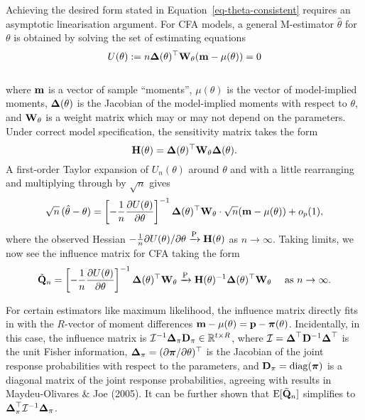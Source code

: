 \documentclass[
  letterpaper,
  DIV=11,
  numbers=noendperiod]{scrartcl}
\begin{document}
Achieving the desired form stated in Equation~\ref{eq-theta-consistent}
requires an asymptotic linearisation argument. For CFA models, a general
M-estimator \(\hat\theta\) for \(\theta\) is obtained by solving the set
of estimating equations \[
U(\theta) := n {\boldsymbol\Delta}(\theta)^\top {\mathbf W}_{\theta} ({\mathbf m} - \mu(\theta)) = 0
\]\\
where \({\mathbf m}\) is a vector of sample ``moments'', \(\mu(\theta)\) is the
vector of model-implied moments, \({\boldsymbol\Delta}(\theta)\) is the Jacobian of
the model-implied moments with respect to \(\theta\), and
\({\mathbf W}_{\theta}\) is a weight matrix which may or may not depend on the
parameters. Under correct model specification, the sensitivity matrix
takes the form \[
{\mathbf H}(\theta) = {\boldsymbol\Delta}(\theta)^{\top} {\mathbf W}_{\theta}  {\boldsymbol\Delta}(\theta).
\] A first-order Taylor expansion of \(U_n(\theta)\) around \(\theta\)
and with a little rearranging and multiplying through by \(\sqrt n\)
gives\\
\[
\sqrt{n}\,(\hat\theta - \theta)
=
\left[ - \frac{1}{n} \frac{\partial U(\theta)}{\partial\theta} \right]^{-1}
{\boldsymbol\Delta}(\theta)^\top {\mathbf W}_{\theta} \cdot \sqrt n ({\mathbf m} - \mu(\theta))
+ o_p(1),
\] where the observed Hessian
\(-\frac{1}{n}\partial U(\theta) / \partial\theta \xrightarrow{\text P} {\mathbf H}(\theta)\)
as \(n \to \infty\). Taking limits, we now see the influence matrix for
CFA taking the form \[
\tilde {{\mathbf Q}}_n = \left[ - \frac{1}{n} \frac{\partial U(\theta)}{\partial\theta} \right]^{-1}
{\boldsymbol\Delta}(\theta)^\top {\mathbf W}_{\theta} \xrightarrow{\text P} {\mathbf H}(\theta)^{-1} {\boldsymbol\Delta}(\theta)^\top {\mathbf W}_{\theta} \quad \text{ as } n\to\infty.
\]

For certain estimators like maximum likelihood, the influence matrix
directly fits in with the \(R\)-vector of moment differences
\({\mathbf m} - \mu(\theta) = {\mathbf p} - {\boldsymbol\pi}(\theta)\). Incidentally, in this case,
the influence matrix is
\({\mathcal I}^{-1} {\boldsymbol\Delta}_\pi {\mathbf D}_\pi \in \mathbb{R}^{t \times R}\), where
\({\mathcal I}= {\boldsymbol\Delta}^\top {\mathbf D}^{-1} {\boldsymbol\Delta}^\top\) is the unit Fisher
information, \({\boldsymbol\Delta}_\pi= (\partial {\boldsymbol\pi} / \partial \theta)^\top\) is
the Jacobian of the joint response probabilities with respect to the
parameters, and \({\mathbf D}_\pi = \operatorname{diag}({\boldsymbol\pi})\) is a diagonal matrix of the
joint response probabilities, agreeing with results in Maydeu-Olivares
\& Joe (2005). It can be further shown that \(\operatorname{E}[\tilde{{\mathbf Q}}_n]\)
simplifies to \({\boldsymbol\Delta}_\pi^\top {\mathcal I}^{-1} {\boldsymbol\Delta}_\pi\).
\end{document}
